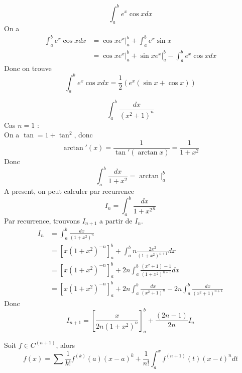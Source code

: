 \documentclass[../main.tex]{subfiles}
\begin{document}
\begin{exemple}
\[ 
\int_{ a }^{ b } e^{x}  \cos x dx
\]
On a 
\begin{align*}
	\int_{ a }^{ b } e^{x} \cos x dx &= \cos x e^{x} \big\vert_{a}^{b}+ \int_{ a }^{ b } e^{x} \sin x\\
	&= \cos x e^{x} \big\vert_{a}^{b} + \sin x e^{x} \big\vert_{a} ^{b} - \int_{ a }^{ b } e^{x} \cos x dx
\end{align*}
Donc on trouve
\[ 
	\int_{ a }^{ b } e^{x} \cos x dx = \frac{1}{2} \left( e^{x} ( \sin x + \cos x)  \right) 
\]

\end{exemple}
\begin{exemple}
\[ 
	\int_{ a }^{ b } \frac{dx}{( x^{2}+1) ^{n}}
\]
Cas $n=1$ :\\
On a 
$\tan = 1 + \tan^{2}$, donc
\[ 
	\arctan '( x) = \frac{1}{\tan'( \arctan x) } = \frac{1}{1+x^{2}}
\]
Donc
\[ 
\int_{ a }^{ b }\frac{dx}{1+x^{2}}= \arctan \big\vert_{a}^{b}
\]
A present, on peut calculer par recurrence
\[ 
I_n=\int_{ a }^{ b }\frac{dx}{{ 1+x^{2} }^{n}}
\]
Par recurrence, trouvons $I_{n+1} $ a partir de $I_n$.
\begin{align*}
	I_n &= \int_{ a }^{ b }\frac{dx}{( 1+x^{2}) ^{n}}\\
	    &= [ x ( 1+x^{2}) ^{-n}] _{a} ^{b} + \int_{ a }^{ b } n \frac{2 x^{2}}{( 1+x^{2})^{n+1}}dx\\
	    &= [ x ( 1+x^{2}) ^{-n}] _{a} ^{b} + 2n \int_{ a }^{ b } \frac{( x^{2}+1) -1}{( 1+x^{2}) ^{n+1}}dx\\
	    &= [ x ( 1+x^{2}) ^{-n}] _{a} ^{b} + 2n \int_{ a }^{ b }\frac{dx}{( x^{2}+1 )^{n}} - 2n \int_{ a }^{ b }\frac{dx}{( x^{2}+1 )^{n+1}}
\end{align*}
Donc
\[ 
	I_{n+1} = [ \frac{x}{2n ( 1+x^{2}) ^{n}}]_{a}^{b}+\frac{( 2n-1)}{2n} I_n 
\]


	

\end{exemple}
\begin{thm}
	Soit $f \in C^{( n+1) }$, alors
	\[ 
		f( x) = \sum \frac{1}{k!}f^{( k) }( a) ( x-a) ^{k} + \frac{1}{n!}\int_{ a }^{ x } f^{( n+1) }( t) ( x-t) ^{n}dt
	\]
	

\end{thm}
\end{document}
